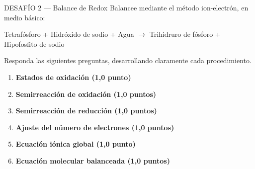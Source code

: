 \documentclass[letterpaper, 12pt, twoside]{article}
\begin{document}
\vspace{1cm}
\newpage
\thispagestyle{fancy}
\vspace*{0.2cm}
\begin{desafiobox}{DESAFÍO 2 — Balance de Redox}
{Balancee mediante el método ion-electrón, en medio básico:}

\vspace{0.2cm}
\begin{center}
    Tetrafósforo + Hidróxido de sodio + Agua $\rightarrow$ Trihidruro de fósforo + Hipofosfito de sodio
\end{center}
\vspace{0.2cm}

Responda las siguientes preguntas, desarrollando claramente cada procedimiento.
\vspace{0.25cm}

\begin{enumerate}[label=\textbf{\alph*.}, leftmargin=15pt, itemsep=0.4em]
    \item \textbf{Estados de oxidación (1,0 punto)}
    \item \textbf{Semirreacción de oxidación (1,0 puntos)}
    
    \item \textbf{Semirreacción de reducción (1,0 puntos)}
    
    \item \textbf{Ajuste del número de electrones (1,0 puntos)}
    
    \item \textbf{Ecuación iónica global (1,0 punto)}
    
    \item \textbf{Ecuación molecular balanceada (1,0 puntos)}
\end{enumerate}
\end{desafiobox}
\end{document}

